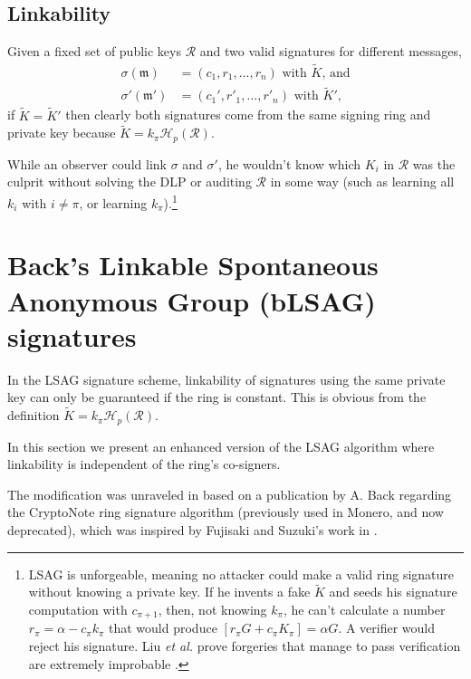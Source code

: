 \subsection*{Linkability}

Given a fixed set of public keys \(\mathcal{R}\) and two valid signatures for different messages, \vspace{.1cm}
\begin{align*}
\sigma(\mathfrak{m})   &= (c_1, r_1, ..., r_n)\textrm{ with } \tilde{K}\textrm{, and}\\
\sigma'(\mathfrak{m}')  &= (c_1', r'_1, ..., r'_n)\textrm{ with } \tilde{K}'\textrm{,}
\end{align*}
\quad if \(\tilde{K} =  \tilde{K}'\) then clearly both signatures come from the same signing ring and private key because $\tilde{K}= k_{\pi} \mathcal{H}_p(\mathcal{R})$.

While an observer could link $\sigma$ and $\sigma'$, he wouldn’t know which $K_i$ in $\mathcal{R}$ was the culprit without solving the DLP or auditing $\mathcal{R}$ in some way (such as learning all $k_i$ with $i \neq \pi$, or learning $k_\pi$).\footnote{\label{lsag_unforgeable_note}LSAG is unforgeable, meaning no attacker could make a valid ring signature without knowing a private key. If he invents a fake $\tilde{K}$ and seeds his signature computation with $c_{\pi+1}$, then, not knowing $k_\pi$, he can’t calculate a number $r_\pi = \alpha - c_\pi k_\pi$ that would produce $[r_\pi G + c_\pi K_\pi] = \alpha G$. A verifier would reject his signature. Liu {\em et al.} prove forgeries that manage to pass verification are extremely improbable \cite{Liu2004}.}



\section{Back's Linkable Spontaneous Anonymous Group (bLSAG) signatures}
\label{blsag_note}

In the LSAG signature scheme, linkability of signatures using the same private key can only be guaranteed if the ring is constant. This is obvious from the definition \(\tilde{K} = k_\pi \mathcal{H}_p(\mathcal{R})\).

In this section we present an enhanced version of the LSAG algorithm where linkability is independent of the ring’s co-signers.

The modification was unraveled in \cite{MRL-0005} based on a publication by A. Back \cite{AdamBack-ring-efficiency} regarding the CryptoNote \cite{cryptoNoteWhitePaper} ring signature algorithm (previously used in Monero, and now deprecated), which was inspired by Fujisaki and Suzuki's work in \cite{Fujisaki2007}.


